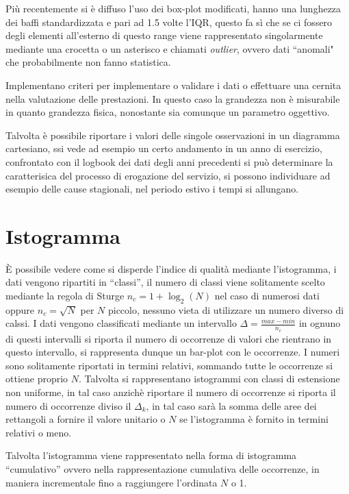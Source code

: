 Più recentemente si è diffuso l'uso dei box-plot modificati, hanno una 
lunghezza dei baffi standardizzata e pari ad 1.5 volte l'IQR, questo fa sì che 
se ci fossero degli elementi all'esterno di questo range viene rappresentato 
singolarmente mediante una crocetta o un asterisco e chiamati \textit{outlier}, 
ovvero dati ``anomali" che probabilmente non fanno statistica.

Implementano criteri per implementare o validare i dati o effettuare una 
cernita nella valutazione delle prestazioni. In questo caso la grandezza non è 
misurabile in quanto grandezza fisica, nonostante sia comunque un parametro 
oggettivo.


Talvolta è possibile riportare i valori delle singole osservazioni in un 
diagramma cartesiano, ssi vede ad esempio un certo andamento in un anno di 
esercizio, confrontato con il logbook dei dati degli anni precedenti si può 
determinare la caratterisica del processo di erogazione del servizio, si 
possono individuare ad esempio delle cause stagionali, nel periodo estivo i 
tempi si allungano.

\section{Istogramma}
È possibile vedere come si disperde l'indice di qualità mediante l'istogramma, 
i dati vengono ripartiti in ``classi'', il numero di classi viene solitamente 
scelto mediante la regola di Sturge $n_c = 1 + \log_2 (N)$ nel caso di numerosi 
dati oppure $n_c = \sqrt{N}$ per $N$ piccolo, nessuno vieta di utilizzare un 
numero diverso di calssi.
I dati vengono classificati mediante un intervallo $\Delta = \frac{max-min}{n_c}
$ in ognuno di questi intervalli si riporta il numero di occorrenze di valori 
che rientrano in questo intervallo, si rappresenta dunque un bar-plot con le 
occorrenze.
I numeri sono solitamente riportati in termini relativi, sommando tutte le 
occorrenze si ottiene proprio $N$.
Talvolta si rappresentano istogrammi con classi di estensione non uniforme, in 
tal caso anzichè riportare il numero di occorrenze si riporta il numero di 
occorrenze diviso il $\Delta_k$, in tal caso sarà la somma delle aree dei 
rettangoli a fornire il valore unitario o $N$ se l'istogramma è fornito in 
termini relativi o meno.

Talvolta l'istogramma viene rappresentato nella forma di istogramma 
``cumulativo'' ovvero nella rappresentazione cumulativa delle occorrenze, in 
maniera incrementale fino a raggiungere l'ordinata $N$ o 1.

